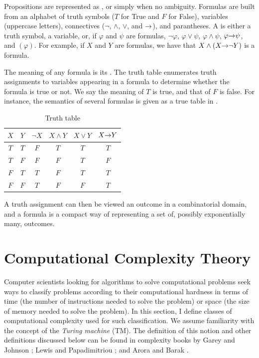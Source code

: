 Propositions are represented as , or simply  when no ambiguity.
Formulas are built from an alphabet of truth symbols ($T$ for True and $F$ for False),
variables (uppercase letters), connectives ($\neg$, $\land$, $\lor$, and $\mathit{\rightarrow}$), and parantheses.
A  is either a truth symbol, a variable, or, if $\varphi$ and $\psi$ are formulas,
$\neg \varphi$, $\varphi \lor \psi$, $\varphi \land \psi$, $ \varphi \mathit{\rightarrow} \psi$, and $(\varphi)$.
For example, if $X$ and $Y$ are formulas, we have that $X \land (X \mathit{\rightarrow} \neg Y)$ is a formula.

The meaning of any formula is its .
The truth table enumerates truth assignments to variables appearing in a formula to determine
whether the formula is true or not.
We say the meaning of $T$ is true, and that of $F$ is false.
For instance, the semantics of several formulas is given as a true table in .

\begin{table}[ht]
\centering
	\begin{tabular}{ |c c|c c c c| }
	  \hline
	  $X$ & $Y$ & $\neg X$ & $X \land Y$ & $X \lor Y$ & $X \mathit{\rightarrow} Y$ \\
	  \hline
		$T$ & $T$ & $F$ & $T$ & $T$ & $T$ \\
	  \hline                            
		$T$ & $F$ & $F$ & $F$ & $T$ & $F$ \\
	  \hline                            
		$F$ & $T$ & $T$ & $F$ & $T$ & $T$ \\
	  \hline                            
		$F$ & $F$ & $T$ & $F$ & $F$ & $T$ \\
	  \hline
	\end{tabular}
	\caption{Truth table\label{tbl:truth}}
\end{table}

A truth assignment can then be viewed an outcome in a combinatorial domain,
and a formula is a compact way of representing a set of, 
possibly exponentially many, outcomes.



\section{Computational Complexity Theory \label{sec:comp_theory}}

Computer scientists looking for algorithms to solve computational problems
seek ways to classify problems according to their computational hardness
in terms of time (the number of instructions needed to solve the problem) 
or space (the size of memory needed to solve the problem).
In this section, I define classes of computational
complexity used for such classification.
We assume familiarity with the concept of the \textit{Turing machine} (TM).
The definition of this notion and other definitions discussed 
below can be found in complexity
books by Garey and Johnson \cite{gar-joh:b:int}; Lewis and Papadimitriou
\cite{Lewis:Comput}; and Arora and Barak \cite{Arora:Comput}.



